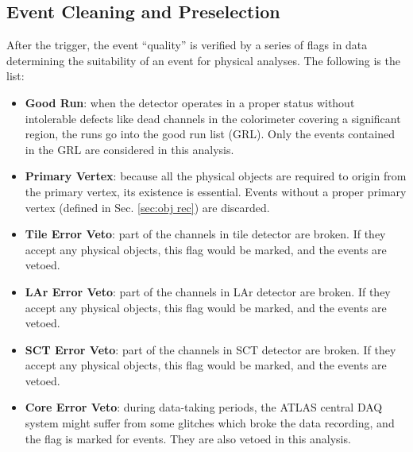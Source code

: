 \subsection{Event Cleaning and Preselection}
After the trigger, the event ``quality'' is verified by a series of flags in data determining the suitability of an event for physical analyses. The following is the list:
\begin{itemize}
	\item {\bf Good Run}: when the detector operates in a proper status without intolerable defects like dead channels in the colorimeter covering a significant region, the runs go into the good run list (GRL). Only the events contained in the GRL are considered in this analysis. 
	\item {\bf Primary Vertex}: because all the physical objects are required to origin from the primary vertex, its existence is essential. Events without a proper primary vertex (defined in Sec. \ref{sec:obj rec}) are discarded.
	\item {\bf Tile Error Veto}: part of the channels in tile detector are broken. If they accept any physical objects, this flag would be marked, and the events are vetoed.
	\item {\bf LAr Error Veto}: part of the channels in LAr detector are broken. If they accept any physical objects, this flag would be marked, and the events are vetoed.
	\item {\bf SCT Error Veto}: part of the channels in SCT detector are broken. If they accept any physical objects, this flag would be marked, and the events are vetoed.
	\item {\bf Core Error Veto}: during data-taking periods, the ATLAS central DAQ system might suffer from some glitches which broke the data recording, and the flag is marked for events. They are also vetoed in this analysis. 
\end{itemize}
